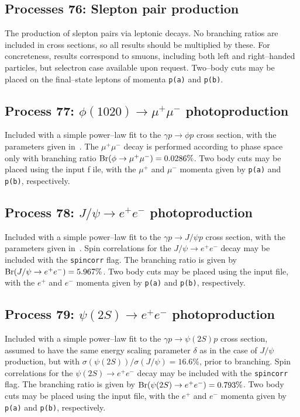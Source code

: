 \documentclass[12pt]{article}
\begin{document}
\subsection{Processes 76: Slepton pair production}

The production of slepton pairs via leptonic decays. No branching ratios are included in cross sections, so all results should be multiplied by these. 
For concreteness, results correspond to smuons, including both left and right--handed particles, but selectron case available upon request. Two--body 
cuts may be placed on the final--state leptons of momenta  \texttt{p(a)} and \texttt{p(b)}. 

\subsection{Process 77: $\phi(1020)\to \mu^+\mu^-$ photoproduction}

Included with a simple power--law fit to the $\gamma p\to \phi p$ cross section, with the parameters given in~\cite{Harland-Lang:2015cta}. The $\mu^+\mu^-$ 
decay is performed according to phase space only with branching ratio ${\rm Br}(\phi \to \mu^+\mu^-)=0.0286\%$. Two body cuts may be placed using the input f
ile, with the $\mu^+$ and $\mu^-$  momenta given by \texttt{p(a)} and \texttt{p(b)}, respectively.

\subsection{Process 78: $J/\psi\to e^+e^-$ photoproduction}

Included with a simple power--law fit to the $\gamma p\to J/\psi p$ cross section, with the parameters given in~\cite{Harland-Lang:2015cta}. Spin 
correlations for the $J/\psi\to e^+ e^-$ decay may be included with the \texttt{spincorr} flag. The branching ratio is given by 
${\rm Br}(J/\psi \to e^+ e^-)=5.967\%$. Two body cuts may be placed using the input file, with the $e^+$ and $e^-$  momenta given by \texttt{p(a)} 
and \texttt{p(b)}, respectively.

\subsection{Process 79: $\psi(2S)\to e^+ e^-$ photoproduction}

Included with a simple power--law fit to the $\gamma p\to \psi(2S) p$ cross section, assumed to have the same energy scaling parameter $\delta$ as in the 
case of $J/\psi$ production, but with $\sigma(\psi(2S))/\sigma(J/\psi)=16.6\%$, prior to branching. Spin correlations for the $\psi(2S)\to e^+ e^-$ decay 
may be included with the \texttt{spincorr} flag. The branching ratio is given by ${\rm Br}(\psi(2S) \to e^+ e^-)=0.793\%$. Two body cuts may be placed using 
the input file, with the $e^+$ and $e^-$ momenta given by \texttt{p(a)} and \texttt{p(b)}, respectively.
\end{document}
